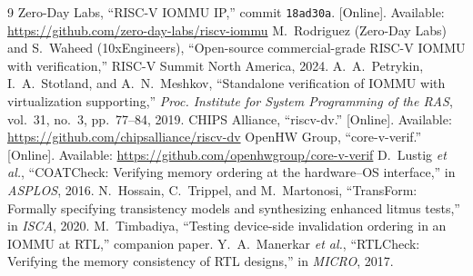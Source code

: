 \documentclass[conference]{IEEEtran}
\begin{document}
\begin{thebibliography}{9}
 Zero-Day Labs, ``RISC-V IOMMU IP,'' commit \texttt{18ad30a}.
[Online]. Available: \url{https://github.com/zero-day-labs/riscv-iommu}
 M.~Rodriguez (Zero-Day Labs) and S.~Waheed (10xEngineers),
``Open-source commercial-grade RISC-V IOMMU with verification,'' RISC-V Summit
North America, 2024.
 A.~A.~Petrykin, I.~A.~Stotland, and A.~N.~Meshkov, ``Standalone
verification of IOMMU with virtualization supporting,'' \emph{Proc. Institute
for System Programming of the RAS}, vol.~31, no.~3, pp.~77--84, 2019.
 CHIPS Alliance, ``riscv-dv.'' [Online]. Available:
\url{https://github.com/chipsalliance/riscv-dv}
 OpenHW Group, ``core-v-verif.'' [Online]. Available:
\url{https://github.com/openhwgroup/core-v-verif}
 D.~Lustig \emph{et al.}, ``COATCheck: Verifying memory
ordering at the hardware--OS interface,'' in \emph{ASPLOS}, 2016.
 N.~Hossain, C.~Trippel, and M.~Martonosi,
``TransForm: Formally specifying transistency models and synthesizing enhanced
litmus tests,'' in \emph{ISCA}, 2020.
 M.~Timbadiya, ``Testing device-side invalidation ordering
in an IOMMU at RTL,'' companion paper.
 Y.~A.~Manerkar \emph{et al.}, ``RTLCheck: Verifying the
memory consistency of RTL designs,'' in \emph{MICRO}, 2017.
\end{thebibliography}
\end{document}
